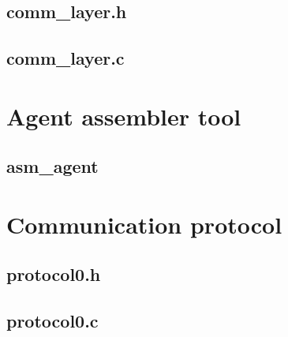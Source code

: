 \documentclass{scrreprt}
\begin{document}
\subsection{comm\_layer.h}

\subsection{comm\_layer.c}


\section{Agent assembler tool}
\subsection{asm\_agent}
\lstset{ language=Python, }


\section{Communication protocol}
\lstset{ language=C, }
\subsection{protocol0.h}

\subsection{protocol0.c}

\end{document}
